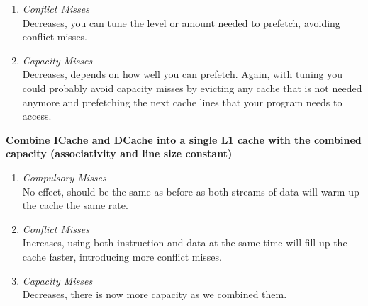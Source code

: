 \documentclass[11pt]{article}
\begin{document}
\begin{Parts}
\begin{enumerate}[i]
			\item \textit{Conflict Misses} \\
				Decreases, you can tune the level or amount needed to prefetch, avoiding conflict misses.
			\item \textit{Capacity Misses} \\
				Decreases, depends on how well you can prefetch. Again, with tuning you could probably avoid capacity misses by evicting any cache that is not needed anymore and prefetching the next cache lines that your program needs to access.
		\end{enumerate}
	\Part \textbf{Combine ICache and DCache into a single L1 cache with the combined capacity (associativity and line size constant)} \\ 
		\begin{enumerate}[i]
			\item \textit{Compulsory Misses} \\
				No effect, should be the same as before as both streams of data will warm up the cache the same rate.
			\item \textit{Conflict Misses} \\
				Increases, using both instruction and data at the same time will fill up the cache faster, introducing more conflict misses.
			\item \textit{Capacity Misses} \\
				Decreases, there is now more capacity as we combined them.
		\end{enumerate}
\end{Parts}
		
\newpage
\end{document}
